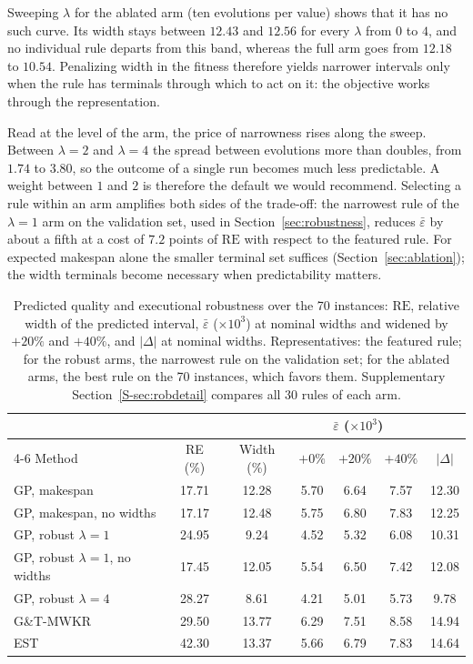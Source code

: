 \documentclass[review,authoryear,11pt]{elsarticle}
\newcommand{\RE}{\mathrm{RE}}
\begin{document}
Sweeping $\lambda$ for the ablated arm (ten evolutions per value)
shows that it has no such curve. Its width stays between $12.43$ and
$12.56$ for every $\lambda$ from $0$ to $4$, and no individual rule
departs from this band, whereas the full arm goes from $12.18$ to
$10.54$. Penalizing width in the fitness therefore yields narrower
intervals only when the rule has terminals through which to act on it:
the objective works through the representation.

Read at the level of the arm, the price of narrowness rises along the
sweep. Between $\lambda = 2$ and $\lambda = 4$ the spread between
evolutions more than doubles, from $1.74$ to $3.80$, so the outcome of a
single run becomes much less predictable. A weight between $1$ and $2$
is therefore the default we would recommend. Selecting a rule within an
arm amplifies both sides of the trade-off: the narrowest rule of the
$\lambda = 1$ arm on the validation set, used in
Section~\ref{sec:robustness}, reduces $\bar\varepsilon$ by about a fifth
at a cost of $7.2$ points of $\RE$ with respect to the featured rule. For expected makespan alone the smaller
terminal set suffices (Section~\ref{sec:ablation}); the width terminals
become necessary when predictability matters.


\begin{table}[t]
\centering\small
\setlength{\tabcolsep}{4pt}
\caption{Predicted quality and executional robustness over the 70 instances:
$\RE$, relative width of the predicted interval, $\bar\varepsilon$
($\times10^3$) at nominal widths and widened by $+20\%$ and $+40\%$, and
$|\Delta|$ at nominal widths. Representatives: the featured rule; for
the robust arms, the narrowest rule on the validation set; for the
ablated arms, the best rule on the 70 instances, which favors them.
Supplementary Section~\ref{S-sec:robdetail} compares all 30 rules of
each arm.}
\label{tab:robustness}
\begin{tabular}{lcccccc}
\toprule
& & & \multicolumn{3}{c}{$\bar\varepsilon$ ($\times10^3$)} & \\
\cmidrule(lr){4-6}
Method & RE (\%) & Width (\%) & $+0\%$ & $+20\%$ & $+40\%$ &
$|\Delta|$ \\
\midrule
GP, makespan & 17.71 & 12.28 & 5.70 & 6.64 & 7.57 & 12.30 \\
GP, makespan, no widths & 17.17 & 12.48 & 5.75 & 6.80 & 7.83 &
12.25 \\
GP, robust $\lambda{=}1$ & 24.95 & 9.24 & 4.52 & 5.32 & 6.08 &
10.31 \\
GP, robust $\lambda{=}1$, no widths & 17.45 & 12.05 & 5.54 & 6.50 & 7.42 &
12.08 \\
GP, robust $\lambda{=}4$ & 28.27 & 8.61 & 4.21 & 5.01 & 5.73 &
9.78 \\
\midrule
G\&T-MWKR & 29.50 & 13.77 & 6.29 & 7.51 & 8.58 & 14.94 \\
EST & 42.30 & 13.37 & 5.66 & 6.79 & 7.83 & 14.64 \\
\bottomrule
\end{tabular}
\end{table}
\end{document}
